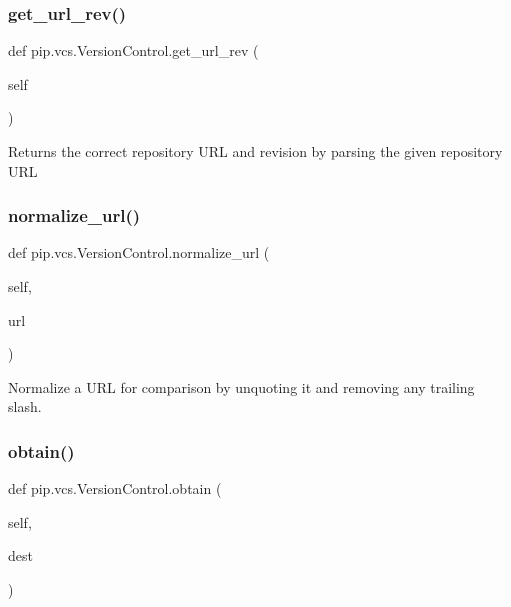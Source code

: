 \subsubsection{\texorpdfstring{get\+\_\+url\+\_\+rev()}{get\_url\_rev()}}
{\footnotesize\ttfamily def pip.\+vcs.\+Version\+Control.\+get\+\_\+url\+\_\+rev (\begin{DoxyParamCaption}\item[{}]{self }\end{DoxyParamCaption})}

\begin{DoxyVerb}Returns the correct repository URL and revision by parsing the given
repository URL
\end{DoxyVerb}
 \mbox{\label{classpip_1_1vcs_1_1_version_control_a889ca4bd7dfd9700c989e843984be462}} 
\subsubsection{\texorpdfstring{normalize\+\_\+url()}{normalize\_url()}}
{\footnotesize\ttfamily def pip.\+vcs.\+Version\+Control.\+normalize\+\_\+url (\begin{DoxyParamCaption}\item[{}]{self,  }\item[{}]{url }\end{DoxyParamCaption})}

\begin{DoxyVerb}Normalize a URL for comparison by unquoting it and removing any
trailing slash.
\end{DoxyVerb}
 \mbox{\label{classpip_1_1vcs_1_1_version_control_a70dae191844588c58622e5d1b1302da0}} 
\subsubsection{\texorpdfstring{obtain()}{obtain()}}
{\footnotesize\ttfamily def pip.\+vcs.\+Version\+Control.\+obtain (\begin{DoxyParamCaption}\item[{}]{self,  }\item[{}]{dest }\end{DoxyParamCaption})}

